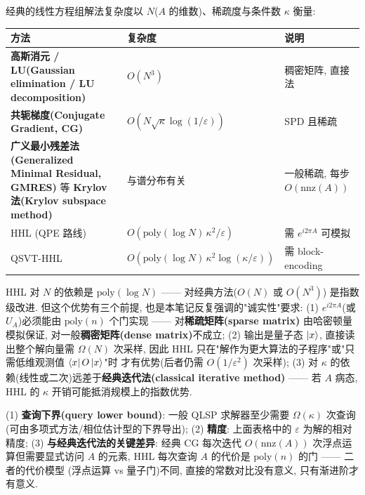 \documentclass[utf8]{article} %
\numberwithin{equation}{section}   %
\newtheorem{Note}{\hskip 2em {\color{red} 注}}[subsection]
\begin{document}
\begin{Note}[与经典线性方程组解法的对比]
    经典的线性方程组解法复杂度以 $N$($A$ 的维数)、稀疏度与条件数 $\kappa$ 衡量:
    \begin{center}
    \begin{tabular}{@{}>{\raggedright\arraybackslash}p{5.2cm}>{\raggedright\arraybackslash}p{4.4cm}>{\raggedright\arraybackslash}p{4.2cm}@{}}
        \toprule
        方法 & 复杂度 & 说明 \\
        \midrule
        \textbf{高斯消元 / LU(Gaussian elimination / LU decomposition)} & $O(N^3)$ & 稠密矩阵, 直接法 \\
        \textbf{共轭梯度(Conjugate Gradient, CG)} & $O(N\sqrt{\kappa}\log(1/\varepsilon))$ & SPD 且稀疏 \\
        \textbf{广义最小残差法(Generalized Minimal Residual, GMRES)} 等 \textbf{Krylov 法(Krylov subspace method)} & 与谱分布有关 & 一般稀疏, 每步 $O(\mathrm{nnz}(A))$ \\
        HHL (QPE 路线) & $O(\mathrm{poly}(\log N)\,\kappa^2/\varepsilon)$ & 需 $e^{i2\pi A}$ 可模拟 \\
        QSVT-HHL & $O(\mathrm{poly}(\log N)\,\kappa^2\log(\kappa/\varepsilon))$ & 需 block-encoding \\
        \bottomrule
    \end{tabular}
    \end{center}
    HHL 对 $N$ 的依赖是 $\mathrm{poly}(\log N)$ —— 对经典方法($O(N)$ 或 $O(N^3)$)
    是指数级改进. 但这个优势有三个前提, 也是本笔记反复强调的"诚实性"要求:
    (1) $e^{i2\pi A}$(或 $U_A$)必须能由 $\mathrm{poly}(n)$ 个门实现 —— 对\textbf{稀疏矩阵(sparse matrix)}
    由哈密顿量模拟保证, 对一般\textbf{稠密矩阵(dense matrix)}不成立;
    (2) 输出是量子态 $\ket{x}$, 直接读出整个解向量需 $\Omega(N)$ 次采样, 因此
    HHL 只在"解作为更大算法的子程序"或"只需低维观测值 $\bra{x}O\ket{x}$"时
    才有优势(后者仍需 $O(1/\varepsilon^2)$ 次采样);
    (3) 对 $\kappa$ 的依赖(线性或二次)远差于\textbf{经典迭代法(classical iterative method)} —— 若 $A$ 病态,
    HHL 的 $\kappa$ 开销可能抵消规模上的指数优势.
\end{Note}

\begin{Note}
    (1) \textbf{查询下界(query lower bound)}: 一般 QLSP 求解器至少需要 $\Omega(\kappa)$ 次查询
    (可由多项式方法/相位估计型的下界导出); (2) \textbf{精度}: 上面表格中的 $\varepsilon$
    为解的相对精度; (3) \textbf{与经典迭代法的关键差异}: 经典 CG 每次迭代
    $O(\mathrm{nnz}(A))$ 次浮点运算但需要显式访问 $A$ 的元素,
    HHL 每次查询 $A$ 的代价是 $\mathrm{poly}(n)$ 的门 —— 二者的代价模型
    (浮点运算 vs 量子门)不同, 直接的常数对比没有意义, 只有渐进阶才有意义.
\end{Note}
\end{document}
